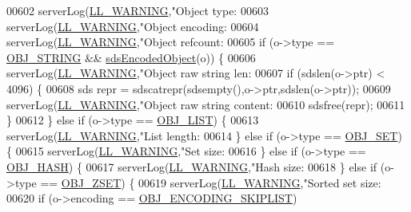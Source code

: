 \begin{DoxyCode}
{{{{{{{{{{{{{{{{{{{{{{{{{{{{{{{00602     serverLog(\hyperlink{server_8h_a31229b9334bba7d6be2a72970967a14b}{LL\_WARNING},\textcolor{stringliteral}{"Object type: %
00603     serverLog(\hyperlink{server_8h_a31229b9334bba7d6be2a72970967a14b}{LL\_WARNING},\textcolor{stringliteral}{"Object encoding: %
00604     serverLog(\hyperlink{server_8h_a31229b9334bba7d6be2a72970967a14b}{LL\_WARNING},\textcolor{stringliteral}{"Object refcount: %
00605     \textcolor{keywordflow}{if} (o->type == \hyperlink{server_8h_a65236ea160f69cdef33ec942092af88f}{OBJ\_STRING} && \hyperlink{server_8h_afcfb5bd97af52d1dbce331745cae030c}{sdsEncodedObject}(o)) \{
00606         serverLog(\hyperlink{server_8h_a31229b9334bba7d6be2a72970967a14b}{LL\_WARNING},\textcolor{stringliteral}{"Object raw string len: %
00607         \textcolor{keywordflow}{if} (sdslen(o->ptr) < 4096) \{
00608             sds repr = sdscatrepr(sdsempty(),o->ptr,sdslen(o->ptr));
00609             serverLog(\hyperlink{server_8h_a31229b9334bba7d6be2a72970967a14b}{LL\_WARNING},\textcolor{stringliteral}{"Object raw string content: %
00610             sdsfree(repr);
00611         \}
00612     \} \textcolor{keywordflow}{else} \textcolor{keywordflow}{if} (o->type == \hyperlink{server_8h_a4a5f22a280949c97a0cb0d4213275126}{OBJ\_LIST}) \{
00613         serverLog(\hyperlink{server_8h_a31229b9334bba7d6be2a72970967a14b}{LL\_WARNING},\textcolor{stringliteral}{"List length: %
00614     \} \textcolor{keywordflow}{else} \textcolor{keywordflow}{if} (o->type == \hyperlink{server_8h_a8d179375a4aac33d3fa7aa80c8ccc75f}{OBJ\_SET}) \{
00615         serverLog(\hyperlink{server_8h_a31229b9334bba7d6be2a72970967a14b}{LL\_WARNING},\textcolor{stringliteral}{"Set size: %
00616     \} \textcolor{keywordflow}{else} \textcolor{keywordflow}{if} (o->type == \hyperlink{server_8h_a87c05ba4f7f36741864277f02a4423fb}{OBJ\_HASH}) \{
00617         serverLog(\hyperlink{server_8h_a31229b9334bba7d6be2a72970967a14b}{LL\_WARNING},\textcolor{stringliteral}{"Hash size: %
00618     \} \textcolor{keywordflow}{else} \textcolor{keywordflow}{if} (o->type == \hyperlink{server_8h_a8c356422ddbc03bd77694880a30a1953}{OBJ\_ZSET}) \{
00619         serverLog(\hyperlink{server_8h_a31229b9334bba7d6be2a72970967a14b}{LL\_WARNING},\textcolor{stringliteral}{"Sorted set size: %
00620         \textcolor{keywordflow}{if} (o->encoding == \hyperlink{server_8h_acfb35db5cb30ed113ed23aeb1a224c4c}{OBJ\_ENCODING\_SKIPLIST})
}}}}}}}}}}}}}}}}}}}}}}}}}}}}}}}}}}}}}}}}
\end{DoxyCode}
